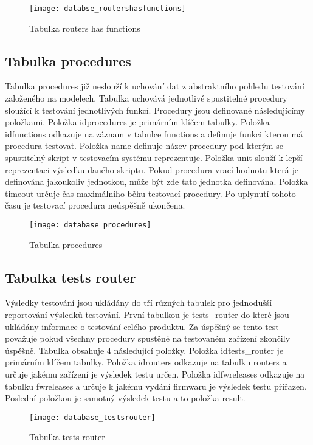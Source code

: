 \begin{figure}[h]
  \centering
  \texttt{[image: databse\_routershasfunctions]}
  \caption{Tabulka routers has functions}
  \label{fig:databse_routershasfunctions}
\end{figure}

\subsection{Tabulka procedures}
Tabulka procedures již neslouží k uchování dat z abstraktního pohledu testování založeného na modelech. Tabulka uchovává jednotlivé spustitelné procedury sloužící k testování jednotlivých funkcí. Procedury jsou definované následujícímy položkami. Položka idprocedures je primárním klíčem tabulky. Položka idfunctions odkazuje na záznam v tabulce functions a definuje funkci kterou má procedura testovat. Položka name definuje název procedury pod kterým se spustitelný skript v testovacím systému reprezentuje. Položka unit slouží k lepší reprezentaci výsledku daného skriptu. Pokud procedura vrací hodnotu která je definována jakoukoliv jednotkou, může být zde tato jednotka definována. Položka timeout určuje čas maximálního běhu testovací procedury. Po uplynutí tohoto času je testovací procedura neúspěšně ukončena.

\begin{figure}[h]
  \centering
  \texttt{[image: database\_procedures]}
  \caption{Tabulka procedures}
  \label{fig:database_procedures}
\end{figure}

\subsection{Tabulka tests router}
Výsledky testování jsou ukládány do tří různých tabulek pro jednodušší reportování výsledků testování. První tabulkou je tests\_router do které jsou ukládány informace o testování celého produktu. Za úspěšný se tento test považuje pokud všechny procedury spustěné na testovaném zařízení zkončily úspěšně. Tabulka obsahuje 4 následující položky. Položka idtests\_router je primárním klíčem tabulky. Položka idrouters odkazuje na tabulku routers a určuje jakému zařízení je výsledek testu určen. Položka idfwreleases odkazuje na tabulku fwreleases a určuje k jakému vydání firmwaru je výsledek testu přiřazen. Poslední položkou je samotný výsledek testu a to položka result.

\begin{figure}[h]
  \centering
  \texttt{[image: database\_testsrouter]}
  \caption{Tabulka tests router}
  \label{fig:database_testsrouter}
\end{figure}

